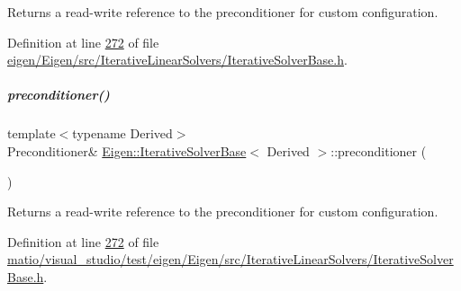 \begin{DoxyReturn}{Returns}
a read-\/write reference to the preconditioner for custom configuration. 
\end{DoxyReturn}


Definition at line \hyperlink{eigen_2_eigen_2src_2_iterative_linear_solvers_2_iterative_solver_base_8h_source_l00272}{272} of file \hyperlink{eigen_2_eigen_2src_2_iterative_linear_solvers_2_iterative_solver_base_8h_source}{eigen/\+Eigen/src/\+Iterative\+Linear\+Solvers/\+Iterative\+Solver\+Base.\+h}.

\mbox{\label{group___iterative_linear_solvers___module_a5e88f2a323a2900205cf807af94f8051}} 
\subparagraph{\texorpdfstring{preconditioner()}{preconditioner()}\hspace{0.1cm}{\footnotesize\ttfamily [2/4]}}
{\footnotesize\ttfamily template$<$typename Derived$>$ \\
Preconditioner\& \hyperlink{group___iterative_linear_solvers___module_class_eigen_1_1_iterative_solver_base}{Eigen\+::\+Iterative\+Solver\+Base}$<$ Derived $>$\+::preconditioner (\begin{DoxyParamCaption}{ }\end{DoxyParamCaption})\hspace{0.3cm}{\ttfamily [inline]}}

\begin{DoxyReturn}{Returns}
a read-\/write reference to the preconditioner for custom configuration. 
\end{DoxyReturn}


Definition at line \hyperlink{matio_2visual__studio_2test_2eigen_2_eigen_2src_2_iterative_linear_solvers_2_iterative_solver_base_8h_source_l00272}{272} of file \hyperlink{matio_2visual__studio_2test_2eigen_2_eigen_2src_2_iterative_linear_solvers_2_iterative_solver_base_8h_source}{matio/visual\+\_\+studio/test/eigen/\+Eigen/src/\+Iterative\+Linear\+Solvers/\+Iterative\+Solver\+Base.\+h}.

